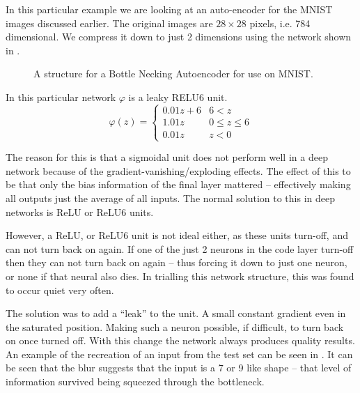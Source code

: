 \documentclass[12pt,parskip]{komatufte}\right
\begin{document}
In this particular example we are looking at an auto-encoder for the MNIST images discussed earlier.
The original images are $28 \times 28$ pixels, i.e. 784 dimensional.
We compress it down to just 2 dimensions using the network shown in .

\begin{figure}
	\caption{A structure for a Bottle Necking Autoencoder for use on MNIST.}
	\label{fig-autoencoder}
	
\end{figure}


In this particular network $\varphi$ is a leaky RELU6 unit.
\begin{equation}
\varphi(z)=\begin{cases}
    0.01z+6 & 6<z \\
	1.01z & 0 \le z \le 6 \\
	0.01z & z < 0
\end{cases}
\end{equation}

The reason for this is that a sigmoidal unit does not perform well in a deep network because of the gradient-vanishing/exploding effects.
The effect of this to be that only the bias information of the final layer mattered -- effectively making all outputs just the average of all inputs.
The normal solution to this in deep networks is ReLU or ReLU6 units.

However, a ReLU, or ReLU6 unit is not ideal either,
as these units turn-off, and can not turn back on again.
If one of the just 2 neurons in the code layer turn-off then they can not turn back on again -- thus forcing it down to just one neuron, or none if that neural also dies.
In trialling this network structure, this was found to occur quiet very often.

The solution was to add a ``leak'' to the unit.
A small constant gradient even in the saturated position.
Making such a neuron possible, if difficult, to turn back on once turned off.
With this change the network always produces quality results.
An example of the recreation of an input from the test set can be seen in 
 . 
It can be seen that the blur suggests that the input is a 7 or 9 like shape -- that level of information survived being squeezed through the bottleneck.
\end{document}
